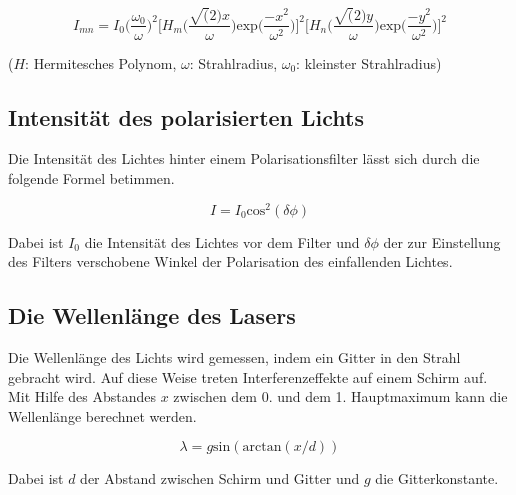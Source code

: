\begin{equation}
  I_{mn} = I_0 \biggl(\frac{\omega_0}{\omega}\biggr)^2 \biggl\lbrack H_m \biggl( \frac{\sqrt(2)x}{\omega} \biggr) \text{exp} \biggl( \frac{-x^2}{\omega^2} \biggr) \biggr\rbrack^2 \biggl\lbrack H_n \biggl( \frac{\sqrt(2)y}{\omega} \biggr) \text{exp} \biggl( \frac{-y^2}{\omega^2} \biggr) \biggr\rbrack^2
\end{equation}

($H$: Hermitesches Polynom, $\omega$: Strahlradius, $\omega_0$: kleinster Strahlradius)

\subsection{Intensität des polarisierten Lichts}

Die Intensität des Lichtes hinter einem Polarisationsfilter lässt sich durch die folgende Formel betimmen.

\begin{equation}
  I = I_0 \text{cos}^2(\delta\phi)
\label{eq:pol}
\end{equation}

Dabei ist $I_0$ die Intensität des Lichtes vor dem Filter und $\delta\phi$ der zur Einstellung des Filters verschobene Winkel
der Polarisation des einfallenden Lichtes.

\subsection{Die Wellenlänge des Lasers}

Die Wellenlänge des Lichts wird gemessen, indem ein Gitter in den Strahl gebracht wird. Auf diese Weise treten Interferenzeffekte
auf einem Schirm auf. Mit Hilfe des Abstandes $x$ zwischen dem 0. und dem 1. Hauptmaximum kann die Wellenlänge berechnet werden.

\begin{equation}
  \lambda = g \text{sin}(\text{arctan}(x/d))
\label{eq:wellen}
\end{equation}

Dabei ist $d$ der Abstand zwischen Schirm und Gitter und $g$ die Gitterkonstante.
